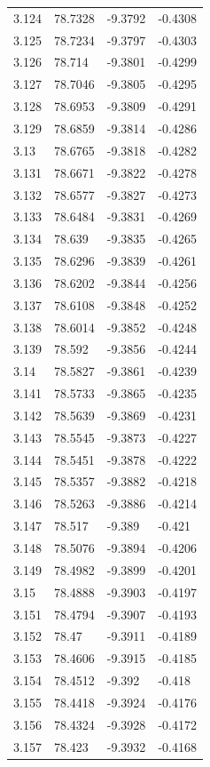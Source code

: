 \begin{tabular}{llll}
3.124 & 78.7328 & -9.3792 & -0.4308 \\
3.125 & 78.7234 & -9.3797 & -0.4303 \\
3.126 & 78.714 & -9.3801 & -0.4299 \\
3.127 & 78.7046 & -9.3805 & -0.4295 \\
3.128 & 78.6953 & -9.3809 & -0.4291 \\
3.129 & 78.6859 & -9.3814 & -0.4286 \\
3.13 & 78.6765 & -9.3818 & -0.4282 \\
3.131 & 78.6671 & -9.3822 & -0.4278 \\
3.132 & 78.6577 & -9.3827 & -0.4273 \\
3.133 & 78.6484 & -9.3831 & -0.4269 \\
3.134 & 78.639 & -9.3835 & -0.4265 \\
3.135 & 78.6296 & -9.3839 & -0.4261 \\
3.136 & 78.6202 & -9.3844 & -0.4256 \\
3.137 & 78.6108 & -9.3848 & -0.4252 \\
3.138 & 78.6014 & -9.3852 & -0.4248 \\
3.139 & 78.592 & -9.3856 & -0.4244 \\
3.14 & 78.5827 & -9.3861 & -0.4239 \\
3.141 & 78.5733 & -9.3865 & -0.4235 \\
3.142 & 78.5639 & -9.3869 & -0.4231 \\
3.143 & 78.5545 & -9.3873 & -0.4227 \\
3.144 & 78.5451 & -9.3878 & -0.4222 \\
3.145 & 78.5357 & -9.3882 & -0.4218 \\
3.146 & 78.5263 & -9.3886 & -0.4214 \\
3.147 & 78.517 & -9.389 & -0.421 \\
3.148 & 78.5076 & -9.3894 & -0.4206 \\
3.149 & 78.4982 & -9.3899 & -0.4201 \\
3.15 & 78.4888 & -9.3903 & -0.4197 \\
3.151 & 78.4794 & -9.3907 & -0.4193 \\
3.152 & 78.47 & -9.3911 & -0.4189 \\
3.153 & 78.4606 & -9.3915 & -0.4185 \\
3.154 & 78.4512 & -9.392 & -0.418 \\
3.155 & 78.4418 & -9.3924 & -0.4176 \\
3.156 & 78.4324 & -9.3928 & -0.4172 \\
3.157 & 78.423 & -9.3932 & -0.4168 \\

\end{tabular}
